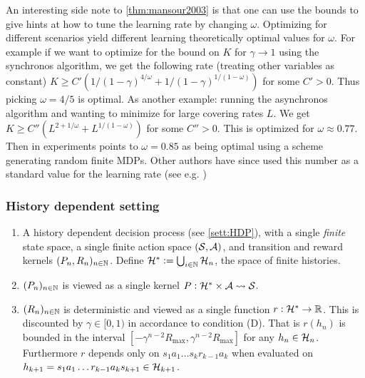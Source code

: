 \begin{rem}
An interesting side note to \cref{thm:mansour2003} is that
one can use the bounds to give hints at how to tune the learning rate
by changing $\omega$. Optimizing for different scenarios yield
different learning theoretically optimal values for $\omega$.
For example if we want to optimize for the bound on $K$ for 
$\gamma \to 1$ using the synchronos algorithm,
we get the following rate (treating other variables as constant)
$K \geq C'(1/(1-\gamma)^{4/\omega} + 1/(1-\gamma)^{1/(1-\omega)})$
for some $C'>0$.
Thus picking $\omega = 4/5$ is optimal.
As another example: running the asynchronos algorithm and wanting to
minimize for large covering rates $L$. We get
$K \geq C''(L^{2+1/\omega} + L^{1/(1-\omega)})$
for some $C'' > 0$.
This is optimized for $\omega \approx 0.77$.
Then in  experiments points to $\omega = 0.85$ as being
optimal using a scheme generating random finite MDPs.
Other authors have since used this number as a standard
value for the learning rate
(see e.g. ) %
\end{rem}

\subsubsection{History dependent setting}

\begin{sett}
  \leavevmode
  \begin{enumerate}
    \item A history dependent decision process (see \cref{sett:HDP}),
      with a single \emph{finite} state space,
      a single finite action space $(\mathcal{S}, \mathcal{A})$,
      and transition and reward kernels $(P_n, R_n)_{n \in \mathbb{N}}$.
      Define $\mathcal{H}^* \vcentcolon= \bigcup_{i \in \mathbb{N}} \mathcal{H}_n$,
      the space of finite histories.
    \item $(P_n)_{n \in \mathbb{N}}$ is viewed as a single kernel
      $P : \mathcal{H}^* \times \mathcal{A} \leadsto \mathcal{S}$.
    \item $(R_n)_{n \in \mathbb{N}}$ is deterministic and viewed as a single function
      $r : \mathcal{H}^* \to \mathbb{R}$.
      This is discounted by $\gamma \in [0,1)$ in accordance to
      condition (D). That is
      $r(h_n)$ is bounded in the interval
      $[-\gamma^{n-2}R_{\max}, \gamma^{n-2} R_{\max}]$ for any
      $h_n \in \mathcal{H}_n$.
      Furthermore $r$ depends only on $s_1 a_1 \dots s_k r_{k-1} a_k$
      when evaluated on
      $h_{k+1} = s_1 a_1 \dots r_{k-1} a_k s_{k+1} \in \mathcal{H}_{k+1}$.
  \end{enumerate}
  \label{sett:HDP_MH}
\end{sett}


